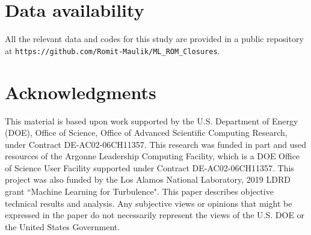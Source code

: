 \documentclass[preprint,12pt]{elsarticle}
\begin{document}
\section*{Data availability}

All the relevant data and codes for this study are provided in a public repository at \texttt{https://github.com/Romit-Maulik/ML\_ROM\_Closures}.

\section*{Acknowledgments}

This material is based upon work supported by the U.S. Department of Energy (DOE), Office of Science, Office of Advanced Scientific Computing Research, under Contract DE-AC02-06CH11357. This research was funded in part and used resources of the Argonne Leadership Computing Facility, which is a DOE Office of Science User Facility supported under Contract DE-AC02-06CH11357. This project was also funded by the Los Alamos National Laboratory, 2019 LDRD grant ``Machine Learning for Turbulence". This paper describes objective technical results and analysis. Any subjective views or opinions that might be expressed in the paper do not necessarily represent the views of the U.S. DOE or the United States Government.













\end{document}

